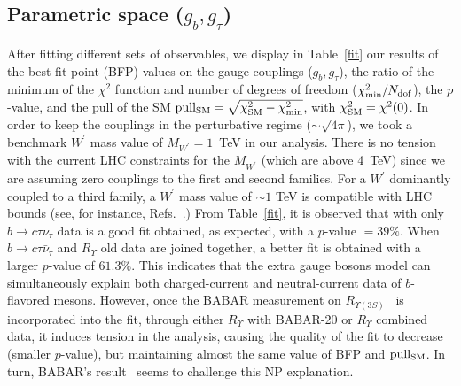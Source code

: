 \documentclass[reprint,showpacs,aps,prd,nofootinbib,superscriptaddress,longbibliography]{revtex4-1}
\begin{document}
\subsection{Parametric space ($g_b,g_{\tau}$)}

After fitting different sets of observables, we display in Table~\ref{fit} our results of the best-fit point (BFP) values on the gauge couplings  ($g_b,g_{\tau}$), the ratio of the minimum of the $\chi^2$ function and number of degrees of freedom ($\chi^2_{\rm min}/N_{\rm dof}$), the $p$-value, and the pull of the SM $\rm{pull_{SM}}=\sqrt{\chi^2_{\rm SM} - \chi^2_{\rm min}}$, with $\chi^2_{\rm SM} = \chi^2(0)$. In order to keep the couplings in the perturbative regime ($\sim \sqrt{4\pi}$), we took a benchmark $W^{\prime}$ mass value of $M_{W^\prime}= 1$~TeV in our analysis.  There is no tension with the current LHC constraints for the $M_{W^\prime}$ (which are above 4~TeV) since we are assuming zero couplings to the first and second families. For a $W^\prime$ dominantly coupled to a third family, a $W^{\prime}$ mass value of $\sim 1$ TeV is compatible with LHC bounds (see, for instance, Refs.~\cite{Iguro:2020keo,Marzocca:2020ueu,Hayreter:2019dzc}.) From Table~\ref{fit}, it is observed that with only $b\to c \tau \bar{\nu}_{\tau}$ data is a good fit obtained, as expected, with a $p$-value $= 39\%$. When $b \to c \tau \bar{\nu}_\tau$ and $R_\Upsilon$ old data are joined together, a better fit is obtained with a larger $p$-value of $61.3 \%$. This indicates that the extra gauge bosons model can simultaneously explain both charged-current and neutral-current data of $b$-flavored mesons. However, once the BABAR measurement on $R_{\Upsilon(3S)}$~\cite{Lees:2020kom} is incorporated into the fit, through either $R_\Upsilon$ with BABAR-20 or $R_\Upsilon$ combined data, it induces tension in the analysis, causing the quality of the fit to decrease (smaller $p$-value), but maintaining almost the same value of BFP and $\rm{pull_{SM}}$. In turn, BABAR's result~\cite{Lees:2020kom} seems to challenge this NP explanation.
\end{document}
